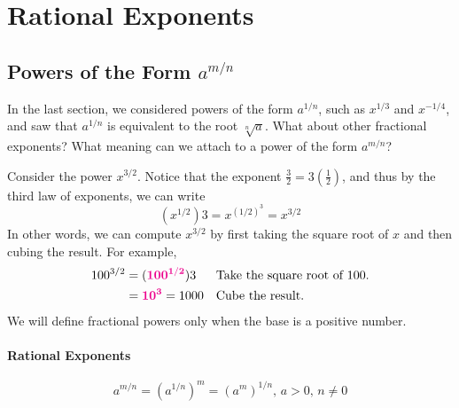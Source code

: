 \documentclass[10pt,]{book}
\theoremstyle{plain}
\theoremstyle{definition}
\theoremstyle{definition}
\theoremstyle{definition}
\theoremstyle{definition}
\theoremstyle{definition}
\numberwithin{equation}{section}
\newcommand{\alert}[1]{\mathbf{\color{magenta}{#1}}}
\newcommand{\gt}{ > }
\newcommand{\amp}{ & }
\begin{document}
\section[Rational Exponents]{Rational Exponents}\label{Rational-Exponents}
\typeout{************************************************}
\typeout{************************************************}
\subsection[Powers of the Form \(a^{m/n}\)]{Powers of the Form \(a^{m/n}\)}\label{subsection-75}

    In the last section, we considered powers of the form \(a^{1/n}\), such as \(x^{1/3}\) and \(x^{−1/4}\), and saw that \(a^{1/n}\) is equivalent to the root \(\sqrt[n]{a}\). What about other fractional exponents? What meaning can we attach to a power of the form \(a^{m /n}\)?
%
\par

    Consider the power \(x^{3/2}\). Notice that the exponent \(\frac{3}{2}= 3(\frac{1}{2})\), and thus by the third law of exponents, we can write
    \begin{equation*}(x^{1/2})3 = x^{(1/2)^3} = x^{3/2}\end{equation*}
    In other words, we can compute \(x^{3/2}\) by first taking the square root of \(x\) and then cubing the result. For example,
    \begin{align*}
        100^{3/2} \amp = (\alert{100^{1/2}})3 \amp\amp \text{Take the square root of 100.}\\
        \amp= \alert{10^3} = 1000  \amp\amp \text{Cube the result.}
    \end{align*}
    We will define fractional powers only when the base is a positive number.
%
\typeout{************************************************}
\typeout{************************************************}
\paragraph[Rational Exponents]{Rational Exponents}\label{paragraphs-51}
%
\begin{equation*}
    a^{m/n} = (a^{1/n})^m = (a^m)^{1/n}\text{, }a \gt 0\text{, } n \ne 0
\end{equation*}\par
\end{document}
